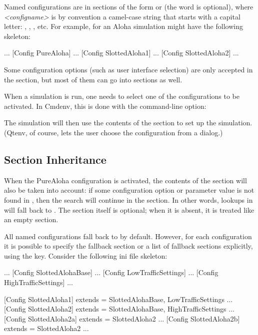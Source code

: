 Named configurations are in sections of the form  or
\ttt{[<configname>]} (the  word is optional), where \textit{<configname>}
is by convention a camel-case string that starts with a capital letter:
, , , etc. For example,
 for an Aloha simulation might have the following skeleton:

\begin{inifile}
[General]
...
[Config PureAloha]
...
[Config SlottedAloha1]
...
[Config SlottedAloha2]
...
\end{inifile}

Some configuration options (such as user interface selection) are only
accepted in the \ttt{[General]} section, but most of them can go into 
sections as well.

When a simulation is run, one needs to select one of the configurations
to be activated. In Cmdenv, this is done with the  command-line option:


The simulation will then use the contents of the 
section to set up the simulation. (Qtenv, of course, lets the user choose
the configuration from a dialog.)


\subsection{Section Inheritance}
\label{sec:config-sim:section-inheritance}

When the PureAloha configuration is activated, the contents of
the \ttt{[General]} section will also be taken into account: if some
configuration option or parameter value is not found in ,
then the search will continue in the \ttt{[General]} section. In
other words, lookups in  will fall back to \ttt{[General]}.
The \ttt{[General]} section itself is optional; when it is absent, it is
treated like an empty \ttt{[General]} section.

All named configurations fall back to \ttt{[General]} by default. However, for
each configuration it is possible to specify the fallback section or a list of
fallback sections explicitly, using the  key. Consider the
following ini file skeleton:

\begin{inifile}
[General]
...
[Config SlottedAlohaBase]
...
[Config LowTrafficSettings]
...
[Config HighTrafficSettings]
...

[Config SlottedAloha1]
extends = SlottedAlohaBase, LowTrafficSettings
...
[Config SlottedAloha2]
extends = SlottedAlohaBase, HighTrafficSettings
...
[Config SlottedAloha2a]
extends = SlottedAloha2
...
[Config SlottedAloha2b]
extends = SlottedAloha2
...
\end{inifile}

